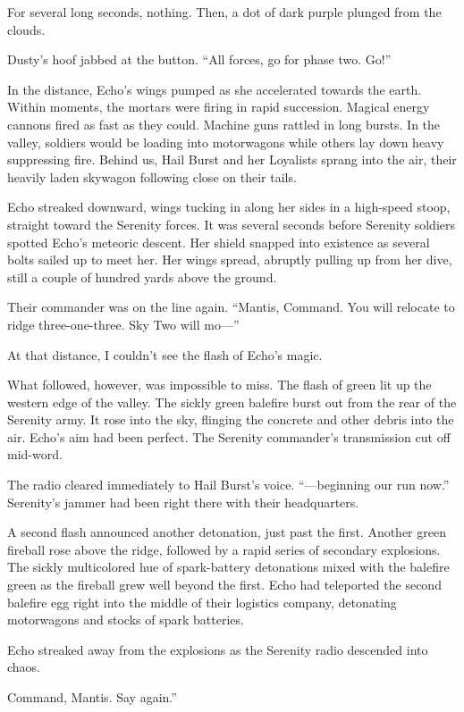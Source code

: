 For several long seconds, nothing. Then, a dot of dark purple plunged from the clouds.

Dusty’s hoof jabbed at the button. “All forces, go for phase two. Go!”

In the distance, Echo’s wings pumped as she accelerated towards the earth. Within moments, the mortars were firing in rapid succession. Magical energy cannons fired as fast as they could. Machine guns rattled in long bursts. In the valley, soldiers would be loading into motorwagons while others lay down heavy suppressing fire. Behind us, Hail Burst and her Loyalists sprang into the air, their heavily laden skywagon following close on their tails.

Echo streaked downward, wings tucking in along her sides in a high-speed stoop, straight toward the Serenity forces. It was several seconds before Serenity soldiers spotted Echo’s meteoric descent. Her shield snapped into existence as several bolts sailed up to meet her. Her wings spread, abruptly pulling up from her dive, still a couple of hundred yards above the ground.

Their commander was on the line again. “Mantis, Command. You will relocate to ridge three-one-three. Sky Two will mo—”

At that distance, I couldn’t see the flash of Echo’s magic.

What followed, however, was impossible to miss. The flash of green lit up the western edge of the valley. The sickly green balefire burst out from the rear of the Serenity army. It rose into the sky, flinging the concrete and other debris into the air. Echo’s aim had been perfect. The Serenity commander’s transmission cut off mid-word.

The radio cleared immediately to Hail Burst’s voice. “—beginning our run now.” Serenity’s jammer had been right there with their headquarters.

A second flash announced another detonation, just past the first. Another green fireball rose above the ridge, followed by a rapid series of secondary explosions. The sickly multicolored hue of spark-battery detonations mixed with the balefire green as the fireball grew well beyond the first. Echo had teleported the second balefire egg right into the middle of their logistics company, detonating motorwagons and stocks of spark batteries.

Echo streaked away from the explosions as the Serenity radio descended into chaos.

\leavevmode{}Command, Mantis. Say again.”

